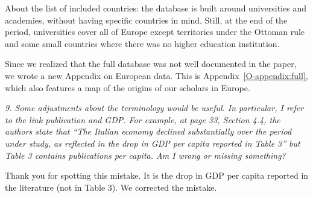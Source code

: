 \documentclass[12pt]{article}
\begin{document}
About the list of included countries: the database is built around universities and academies, without having specific countries in mind. Still, at the end of the period, universities cover all of Europe except territories under the Ottoman rule and some small countries where there was no higher education institution.

Since we realized that the full database was not well documented in the paper, we wrote a new Appendix on European data. This is Appendix~\ref{O-appendix:full}, which also features a map of the origins of our scholars in Europe.


\textit{
9. Some adjustments about the terminology would be useful. In particular, I refer to the link publication and
GDP. For example, at page 33, Section 4.4, the authors state that “The Italian economy declined substantially
over the period under study, as reflected in the drop in GDP per capita reported in Table 3” but Table 3
contains publications per capita. Am I wrong or missing something?
}

Thank you for spotting this mistake. It is the drop in GDP per capita reported in the literature (not in Table 3). We corrected the mistake.





\end{document}
